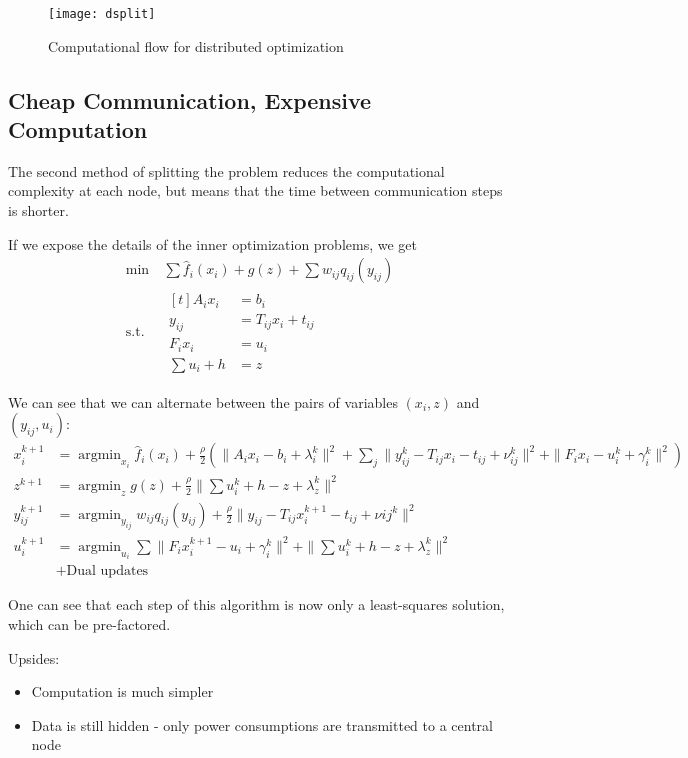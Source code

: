 \documentclass[11pt,a4paper]{article}
\newcommand{\argmin}{\operatorname{argmin}}
\begin{document}
\begin{figure}[htbp]
  \centering
  \texttt{[image: dsplit]}
  \caption{Computational flow for distributed optimization}
  \label{fig:dsplit}
\end{figure}

\subsection*{Cheap Communication, Expensive Computation}
The second method of splitting the problem reduces the computational complexity at each node, but means that the time between communication steps is shorter.

If we expose the details of the inner optimization problems, we get
\begin{align*}
  \min\ & \sum \hat f_i(x_i) + g(z) + \sum w_{ij} q_{ij}(y_{ij})\\
  \text{s.t.}\ & 
  \begin{aligned}[t]
  A_ix_i & = b_i\\
  y_{ij} &= T_{ij}x_i + t_{ij}\\
  F_i x_i &= u_i\\
  \sum u_i + h &= z
  \end{aligned}
\end{align*}

We can see that we can alternate between the pairs of variables $(x_i, z)$ and $(y_{ij}, u_i)$:
\begin{align*}
x_i^{k+1} &= \argmin_{x_i} \hat f_i(x_i) + \frac{\rho}{2}\left( \|A_ix_i - b_i + \lambda_i^k\|^2 + \sum_j\|y_{ij}^k - T_{ij}x_i-t_{ij} + \nu_{ij}^k\|^2 + \|F_ix_i - u_i^k + \gamma_i^k\|^2  \right)\\
z^{k+1} &= \argmin_z g(z) + \frac{\rho}{2}\|\sum u_i^k + h - z + \lambda_z^k\|^2\\
y_{ij}^{k+1} &= \argmin_{y_{ij}} w_{ij}q_{ij}(y_{ij}) + \frac{\rho}{2}\|y_{ij} - T_{ij}x_i^{k+1} - t_{ij} + \nu{ij}^k\|^2\\
u_i^{k+1} &= \argmin_{u_i} \sum \|F_ix_i^{k+1} - u_i + \gamma_i^k\|^2 + \|\sum u_i^k + h - z + \lambda_z^k\|^2\\
& + \text{Dual updates}
\end{align*}

One can see that each step of this algorithm is now only a least-squares solution, which can be pre-factored. 

Upsides:
\begin{itemize}
  \item Computation is much simpler
  \item Data is still hidden - only power consumptions are transmitted to a central node
\end{itemize}
\end{document}
